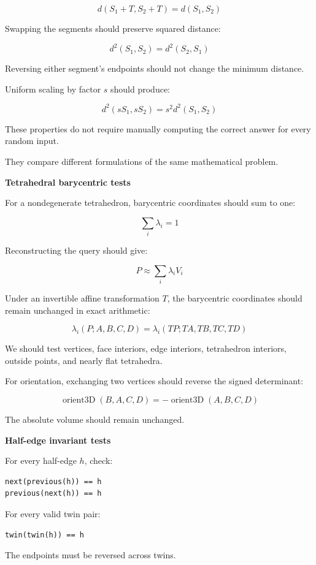 \[
d(S_1+T,S_2+T)=d(S_1,S_2)
\]

Swapping the segments should preserve squared distance:

\[
\boxed{ d^2(S_1,S_2)=d^2(S_2,S_1) }
\]

Reversing either segment's endpoints should not change the minimum distance.

Uniform scaling by factor \(s\) should produce:

\[
\boxed{ d^2(sS_1,sS_2)=s^2d^2(S_1,S_2) }
\]

These properties do not require manually computing the correct answer for every random input.

They compare different formulations of the same mathematical problem.

\textbf{Tetrahedral barycentric tests}

For a nondegenerate tetrahedron, barycentric coordinates should sum to one:

\[
\boxed{ \sum_i\lambda_i=1 }
\]

Reconstructing the query should give:

\[
\boxed{ P\approx\sum_i\lambda_iV_i }
\]

Under an invertible affine transformation \(T\), the barycentric coordinates should remain unchanged in exact arithmetic:

\[
\lambda_i(P;A,B,C,D) = \lambda_i(TP;TA,TB,TC,TD)
\]

We should test vertices, face interiors, edge interiors, tetrahedron interiors, outside points, and nearly flat tetrahedra.

For orientation, exchanging two vertices should reverse the signed determinant:

\[
\operatorname{orient3D}(B,A,C,D) = -\operatorname{orient3D}(A,B,C,D)
\]

The absolute volume should remain unchanged.

\textbf{Half-edge invariant tests}

For every half-edge \(h\), check:

\begin{verbatim}
next(previous(h)) == h
previous(next(h)) == h
\end{verbatim}

For every valid twin pair:

\begin{verbatim}
twin(twin(h)) == h
\end{verbatim}

The endpoints must be reversed across twins.

